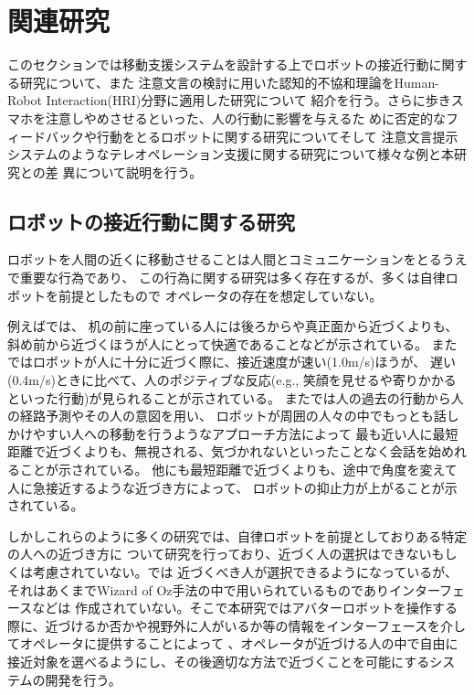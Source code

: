 \documentclass{kuisthesis}
\begin{document}
\section{関連研究}
このセクションでは移動支援システムを設計する上でロボットの接近行動に関する研究について、また
注意文言の検討に用いた認知的不協和理論をHuman-Robot Interaction(HRI)分野に適用した研究について
紹介を行う。さらに歩きスマホを注意しやめさせるといった、人の行動に影響を与えるた
めに否定的なフィードバックや行動をとるロボットに関する研究についてそして
注意文言提示システムのようなテレオペレーション支援に関する研究について様々な例と本研究との差
異について説明を行う。
\subsection{ロボットの接近行動に関する研究}
ロボットを人間の近くに移動させることは人間とコミュニケーションをとるうえで重要な行為であり、
この行為に関する研究は多く存在するが、多くは自律ロボットを前提としたもので
オペレータの存在を想定していない。

例えば\cite{woods2006methodological}では、
机の前に座っている人には後ろからや真正面から近づくよりも、斜め前から近づくほうが人にとって快適であることなどが示されている。
また\cite{joosse2021making}ではロボットが人に十分に近づく際に、接近速度が速い(1.0m/s)ほうが、
遅い(0.4m/s)ときに比べて、人のポジティブな反応(e.g., 笑顔を見せるや寄りかかるといった行動)が見られることが示されている。
また\cite{satake2009approach}では人の過去の行動から人の経路予測やその人の意図を用い、
ロボットが周囲の人々の中でもっとも話しかけやすい人への移動を行うようなアプローチ方法によって
最も近い人に最短距離で近づくよりも、無視される、気づかれないといったことなく会話を始めれることが示されている。
他にも最短距離で近づくよりも、途中で角度を変えて人に急接近するような近づき方によって、
ロボットの抑止力が上がることが示されている\cite{Mizumaru2019}。


しかしこれらのように多くの研究では、自律ロボットを前提としておりある特定の人への近づき方に
ついて研究を行っており、近づく人の選択はできないもしくは考慮されていない。\cite{Mizumaru2019}では
近づくべき人が選択できるようになっているが、それはあくまでWizard of Oz手法の中で用いられているものでありインターフェースなどは
作成されていない。そこで本研究ではアバターロボットを操作する際に、近づけるか否かや視野外に人がいるか等の情報をインターフェースを介してオペレータに提供することによって
、オペレータが近づける人の中で自由に接近対象を選べるようにし、その後適切な方法で近づくことを可能にするシステムの開発を行う。
\end{document}
